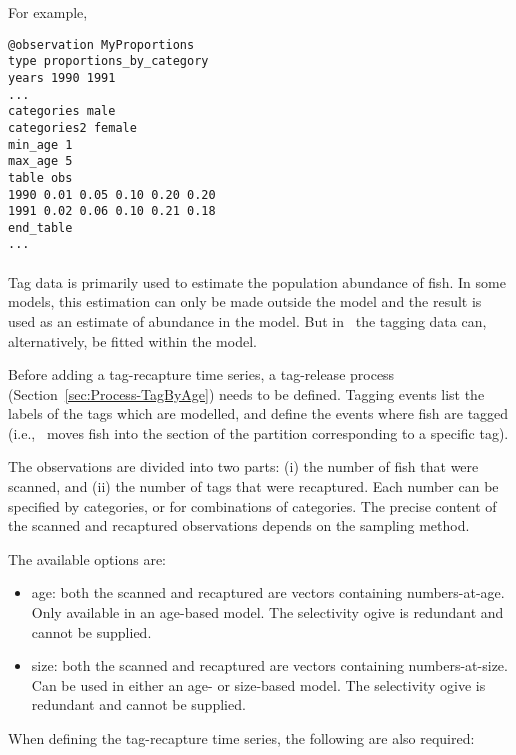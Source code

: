 For example,

{\small{\begin{verbatim}
@observation MyProportions
type proportions_by_category
years 1990 1991
...
categories male
categories2 female
min_age 1
max_age 5
table obs
1990 0.01 0.05 0.10 0.20 0.20
1991 0.02 0.06 0.10 0.21 0.18
end_table
...
\end{verbatim}}}

\paragraph*{\label{sec:Observation-TagRecaptureByLength}}

Tag data is primarily used to estimate the population abundance of fish. In some models, this estimation can only be made outside the model and the result is used as an estimate of abundance in the model. But in \CNAME\ the tagging data can, alternatively, be fitted within the model.

Before adding a tag-recapture time series, a tag-release process (Section~\ref{sec:Process-TagByAge}) needs to be defined. Tagging events list the labels of the tags which are modelled, and define the events where fish are tagged (i.e., \CNAME\ moves fish into the section of the partition corresponding to a specific tag).

The observations are divided into two parts: (i) the number of fish that were scanned, and (ii) the number of tags that were recaptured. Each number can be specified by categories, or for combinations of categories. The precise content of the scanned and recaptured observations depends on the sampling method.

The available options are:

\begin{itemize}
	\item age: both the scanned and recaptured are vectors containing numbers-at-age. Only available in an age-based model. The selectivity ogive is redundant and cannot be supplied.
	\item size: both the scanned and recaptured are vectors containing numbers-at-size. Can be used in either an age- or size-based model. The selectivity ogive is redundant and cannot be supplied.
\end{itemize}

When defining the tag-recapture time series, the following are also required:

